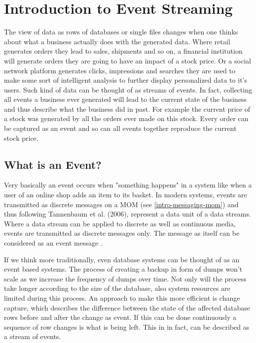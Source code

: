 \chapter{Introduction to Event Streaming}

The view of data as rows of databases or single files changes when one thinks
about what a business actually does with the generated data. Where retail
generates orders they lead to sales, shipments and so on, a financial institution will
generate orders they are going to have an impact of a stock price. Or a social
network platform generates clicks, impressions and searches they are used to
make some sort of intelligent analysis to further display personalized data to
it's users. Such kind of data can be thought of as streams of
events. In fact, collecting all events a business ever generated will lead to the current state
of the business and thus describe what the business did in past. For example the
current price of a stock was generated by all the orders ever made on this
stock. Every order can be captured as an event and so can all events together reproduce
the current stock price.

\section{What is an Event?}
\label{intro-datastream-datastream}
Very basically an event occurs when "something happens"  in a system
like when a user of an online shop adds an item to its basket. In modern systems, events are transmitted as discrete messages on a MOM (see \ref{intro-messaging-mom}) and thus
following Tannenbaum et al. (2006), represent a data unit of a data streams. 
Where a data stream can be applied to discrete as well as continuous media, events are
transmitted as discrete messages only. The message as itself can
be considered as an event message \cite{EIP03}.

If we think more traditionally, even database systems can be thought of as
an event based systems. The process of creating a backup in form of dumps won't scale
as we increase the frequency of dumps over time. Not only will the process take
longer according to the size of the database, also system resources are limited
during this process. An approach to make this more efficient  is change capture,
which describes the difference between the state of the affected database rows
before and after the change as event. If this can be done continuously a sequence of
row changes is what is being left. This in in fact, can be described as a stream
of events.


